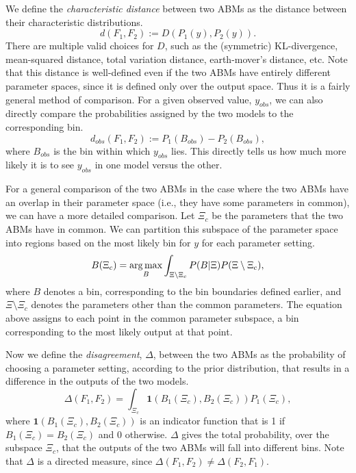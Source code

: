 We define the \emph{characteristic distance} between two ABMs as the distance between their characteristic distributions.
\begin{equation}
d(F_1, F_2) := D(P_1(y), P_2(y)).
\end{equation}
There are multiple valid choices for $D$, such as the (symmetric) KL-divergence, mean-squared distance, total variation distance, earth-mover's distance, etc. Note that this distance is well-defined even if the two ABMs have entirely different parameter spaces, since it is defined only over the output space. Thus it is a fairly general method of comparison. 
For a given observed value, $y_{obs}$, we can also directly compare the 
probabilities assigned by the two models to the corresponding bin.
\begin{equation}
    d_{obs}(F_1, F_2) := P_1(B_{obs}) - P_2(B_{obs}),
\end{equation}
where $B_{obs}$ is the bin within which $y_{obs}$ lies. This directly tells us how much more likely it is to see $y_{obs}$ in one model versus the other.

For a general comparison of the two ABMs in the case where the two ABMs have an overlap in their parameter space (i.e., they have some parameters in common), we can have a more detailed comparison. Let $\Xi_{c}$ be the parameters that the two ABMs have in common. We can partition this subspace of the parameter space into regions based on the most likely bin for $y$ for each parameter setting.
\begin{equation}
    B(\Xi_{c}) = \operatorname*{arg\,max}_B \int_{\Xi \setminus \Xi_{c}} P(B|\Xi)P(\Xi \setminus \Xi_{c}),
\label{eqn:B}
\end{equation}
where $B$ denotes a bin, corresponding to the bin boundaries defined earlier, and $\Xi \setminus \Xi_{c}$ denotes the parameters other than the common parameters. The equation above assigns to each point in the common parameter subspace, a bin corresponding to the most likely output at that point.

Now we define the \emph{disagreement}, $\Delta$, between the two ABMs as the probability of choosing a parameter setting, according to the prior distribution, that results in a difference in the outputs of the two models.
\begin{equation}
    \Delta(F_1, F_2) = \int_{\Xi_{c}} \mathbf{1}(B_1(\Xi_{c}), B_2(\Xi_{c}))P_1(\Xi_{c}),
\end{equation}
where $\mathbf{1}(B_1(\Xi_{c}), B_2(\Xi_{c}))$ is an indicator function that is 1 if $B_1(\Xi_{c}) = B_2(\Xi_{c})$ and 0 otherwise. $\Delta$ gives the total probability, over the subspace $\Xi_c$, that the outputs of the two ABMs will fall into different bins. Note that $\Delta$ is a directed measure, since $\Delta(F_1, F_2) \ne \Delta(F_2, F_1)$.

